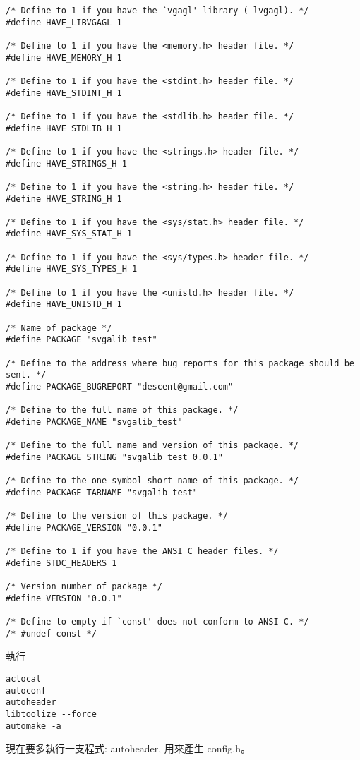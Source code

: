 \documentclass[12pt,a4]{article}
\begin{document}
\begin{CJK}{UTF8}{cwmu}
\begin{verbatim}
/* Define to 1 if you have the `vgagl' library (-lvgagl). */
#define HAVE_LIBVGAGL 1

/* Define to 1 if you have the <memory.h> header file. */
#define HAVE_MEMORY_H 1

/* Define to 1 if you have the <stdint.h> header file. */
#define HAVE_STDINT_H 1

/* Define to 1 if you have the <stdlib.h> header file. */
#define HAVE_STDLIB_H 1

/* Define to 1 if you have the <strings.h> header file. */
#define HAVE_STRINGS_H 1

/* Define to 1 if you have the <string.h> header file. */
#define HAVE_STRING_H 1

/* Define to 1 if you have the <sys/stat.h> header file. */
#define HAVE_SYS_STAT_H 1

/* Define to 1 if you have the <sys/types.h> header file. */
#define HAVE_SYS_TYPES_H 1

/* Define to 1 if you have the <unistd.h> header file. */
#define HAVE_UNISTD_H 1

/* Name of package */
#define PACKAGE "svgalib_test"

/* Define to the address where bug reports for this package should be sent. */
#define PACKAGE_BUGREPORT "descent@gmail.com"

/* Define to the full name of this package. */
#define PACKAGE_NAME "svgalib_test"

/* Define to the full name and version of this package. */
#define PACKAGE_STRING "svgalib_test 0.0.1"

/* Define to the one symbol short name of this package. */
#define PACKAGE_TARNAME "svgalib_test"

/* Define to the version of this package. */
#define PACKAGE_VERSION "0.0.1"

/* Define to 1 if you have the ANSI C header files. */
#define STDC_HEADERS 1

/* Version number of package */
#define VERSION "0.0.1"

/* Define to empty if `const' does not conform to ANSI C. */
/* #undef const */
\end{verbatim}


執行
\begin{verbatim}
aclocal
autoconf
autoheader
libtoolize --force 
automake -a
\end{verbatim}

現在要多執行一支程式: autoheader, 用來產生 config.h。



\end{CJK}
\end{document}
